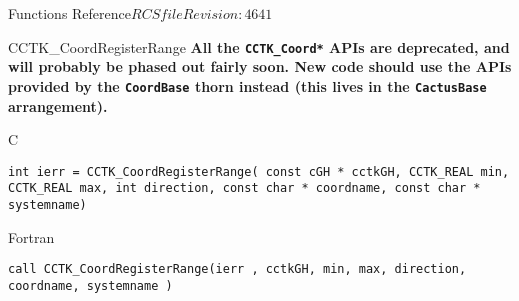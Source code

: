 \begin{cactuspart}{ Functions Reference}{$RCSfile$}{$Revision: 4641 $}
\begin{FunctionDescription}{CCTK\_CoordRegisterRange}
{\textbf{All the \texttt{CCTK\_Coord*} APIs are deprecated,
and will probably be phased out fairly soon.
New code should use the APIs provided by the \texttt{CoordBase} thorn
instead (this lives in the \texttt{CactusBase} arrangement).}
}
\label{CCTK-CoordRegisterRange}
\begin{SynopsisSection}
\begin{Synopsis}{C}
\begin{verbatim}int ierr = CCTK_CoordRegisterRange( const cGH * cctkGH, CCTK_REAL min, CCTK_REAL max, int direction, const char * coordname, const char * systemname)\end{verbatim}
\end{Synopsis}
\begin{Synopsis}{Fortran}
\begin{verbatim}call CCTK_CoordRegisterRange(ierr , cctkGH, min, max, direction, coordname, systemname )


\end{verbatim}
\end{Synopsis}
\end{SynopsisSection}
\end{FunctionDescription}
\end{cactuspart}
